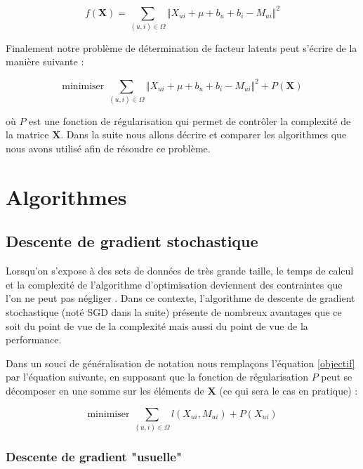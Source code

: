 \documentclass[10pt,a4paper]{article}
\begin{document}
$$ f(\textbf{X}) = \sum_{(u,i)\in\Omega}\Vert X_{ui}+\mu + b_u  + b_i-M_{ui} \Vert^2 $$

Finalement notre problème de détermination de facteur latents peut s'écrire de la manière suivante :

\begin{equation}
\label{objectif}
 \text{minimiser } \sum_{(u,i)\in\Omega}\Vert X_{ui}+\mu + b_u  + b_i-M_{ui} \Vert^2 + P(\textbf{X})
\end{equation}


où $P$ est une fonction de régularisation qui permet de contrôler la complexité de la matrice $\textbf{X}$. Dans la suite nous allons décrire et comparer les algorithmes que nous avons utilisé afin de résoudre ce problème.

\section{Algorithmes}

\subsection{Descente de gradient stochastique}


Lorsqu'on s'expose à des sets de données de très grande taille, le temps de calcul et la complexité de l'algorithme d'optimisation deviennent des contraintes que l'on ne peut pas négliger \cite{bottouSGD} \cite{bottou}. Dans ce contexte, l'algorithme de descente de gradient stochastique (noté SGD dans la suite) présente de nombreux avantages que ce soit du point de vue de la complexité mais aussi du point de vue de la performance.

Dans un souci de généralisation de notation nous remplaçons l'équation \eqref{objectif} par l'équation suivante, en supposant que la fonction de régularisation $P$ peut se décomposer en une somme sur les éléments de \textbf{X} (ce qui sera le cas en pratique) :

\begin{equation}
\label{objectif2}
 \text{minimiser } \sum_{(u,i)\in\Omega}l(X_{ui},M_{ui}) + P(X_{ui})
\end{equation}

\subsubsection*{Descente de gradient "usuelle"}
\end{document}
